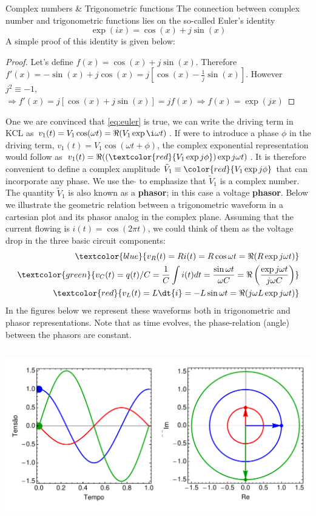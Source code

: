 \begin{frame}[allowframebreaks]{Complex numbers \& Trigonometric functions}
The connection between complex number and trigonometric functions lies on the so-called Euler's identity
\begin{equation}
  \exp(ix)=\cos(x)+j\sin(x)
  \label{eq:euler}
\end{equation}
A simple proof of this identity is given below:
\begin{proof}
Let's define $f(x)=\cos(x)+j\sin(x)$. Therefore $f'(x)=-\sin(x)+j\cos(x)=j[\cos(x)-\frac{1}{j}\sin(x)]$. However $j^2\equiv -1$, $\Rightarrow f'(x)=j[\cos(x)+{j}\sin(x)]=j f(x)\Rightarrow f(x)=\exp(j x)$
\end{proof}
One we are convinced that \ref{eq:euler} is true, we can write the driving term in KCL as $v_1(t)=V_1\cos(\omega t)=\Re(V_1\exp\i\omega t)$. If were to introduce a phase $\phi$ in the driving term, $v_1(t)=V_1\cos(\omega t+\phi)$, the complex exponential representation would follow as $v_1(t)=\Re((\textcolor{red}{V_1\exp j \phi} )\exp j\omega t)$. It is therefore convenient to define a complex amplitude $\tilde{V}_1\equiv\color{red}{V_1\exp j \phi}$ that can incorporate any phase. We use the $\tilde{ }$ to emphasize that $\tilde{V}_1$ is a complex number. The quantity $\tilde{V}_1$ is also known as a \textbf{phasor}; in this case a voltage \textbf{phasor}.
Below we illustrate the geometric relation between a trigonometric waveform in a cartesian plot and its phasor analog in the complex plane. Assuming that the current flowing is $i(t)=\cos(2\pi t)$, we could think of them as the voltage drop in the three basic circuit components:
\begin{eqnarray}
\textcolor{blue}{v_R(t) = R i(t) = R \cos\omega t=\Re (R \exp j\omega t)}\\
\textcolor{green}{v_C(t) = q(t)/C=\frac{1}{C}\int i(t) dt=\frac{\sin \omega t}{\omega C}=\Re\left(\frac{\exp j \omega t}{j\omega C}\right)}\\
\textcolor{red}{v_L(t) = L \dt{i}=-L\sin \omega t=\Re (j \omega L \exp j\omega t)}
\end{eqnarray}
In the figures below we represent these waveforms both in trigonometric  and phasor representations. Note that as time evolves, the phase-relation (angle) between the phasors are constant.
\begin{columns}
	\begin{column}{0.5\textwidth}
		\includegraphics[width=\textwidth]{fasor0.pdf}

\end{column}
\end{columns}
\end{frame}

